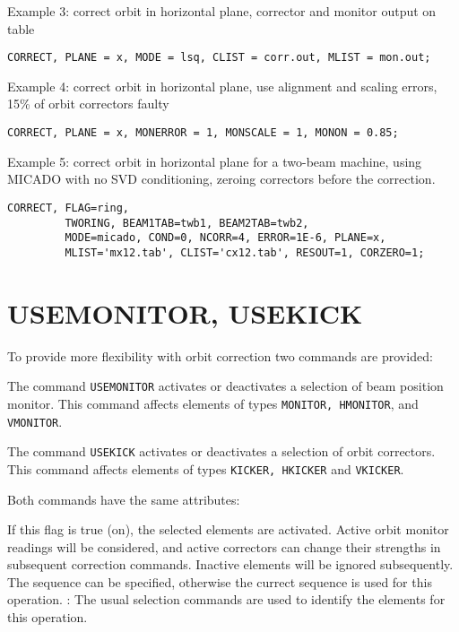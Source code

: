 Example 3: correct orbit in horizontal plane, corrector and monitor
output on table 
\begin{verbatim}
CORRECT, PLANE = x, MODE = lsq, CLIST = corr.out, MLIST = mon.out;   
\end{verbatim}

Example 4: correct orbit in horizontal plane, use alignment and scaling
errors, 15\% of orbit correctors faulty
\begin{verbatim}
CORRECT, PLANE = x, MONERROR = 1, MONSCALE = 1, MONON = 0.85; 
\end{verbatim}

Example 5: correct orbit in horizontal plane for a two-beam machine,
using MICADO with no SVD conditioning, zeroing correctors before the
correction. 
\begin{verbatim}
CORRECT, FLAG=ring,
         TWORING, BEAM1TAB=twb1, BEAM2TAB=twb2,
         MODE=micado, COND=0, NCORR=4, ERROR=1E-6, PLANE=x,
         MLIST='mx12.tab', CLIST='cx12.tab', RESOUT=1, CORZERO=1;
\end{verbatim}




%
\section{USEMONITOR, USEKICK}
\label{sec:activate}
To provide more flexibility with orbit correction two commands are
provided:  


The command \texttt{USEMONITOR} activates or deactivates a
selection of beam position monitor. 
This command affects elements of types \texttt{MONITOR, HMONITOR},
and \texttt{VMONITOR}.    

The command  \texttt{USEKICK} activates or deactivates a selection
of orbit correctors. This command
affects elements of types \texttt{KICKER, HKICKER} and \texttt{VKICKER}. 


Both commands have the same attributes: 
\begin{madlist}
    If this flag is true (on), the selected elements
     are activated. Active orbit monitor readings will be
     considered, and active correctors can change their strengths
     in subsequent correction commands. Inactive elements will be
     ignored subsequently.  
    The sequence can be specified, otherwise the
     currect sequence is used for this operation.  
   : The usual selection commands are
     used to identify the elements for this operation.  
\end{madlist} 

